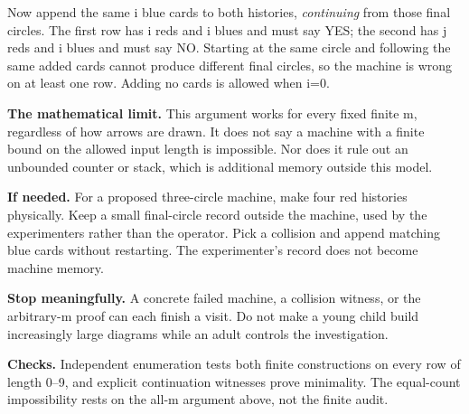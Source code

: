 \documentclass[11pt]{article}
\begin{document}
Now append the same i blue cards to both histories, \emph{continuing} from those final circles. The first row has i reds and i blues and must say YES; the second has j reds and i blues and must say NO. Starting at the same circle and following the same added cards cannot produce different final circles, so the machine is wrong on at least one row. Adding no cards is allowed when i=0.

\textbf{The mathematical limit.} This argument works for every fixed finite m, regardless of how arrows are drawn. It does not say a machine with a finite bound on the allowed input length is impossible. Nor does it rule out an unbounded counter or stack, which is additional memory outside this model.

\textbf{If needed.} For a proposed three-circle machine, make four red histories physically. Keep a small final-circle record outside the machine, used by the experimenters rather than the operator. Pick a collision and append matching blue cards without restarting. The experimenter's record does not become machine memory.

\textbf{Stop meaningfully.} A concrete failed machine, a collision witness, or the arbitrary-m proof can each finish a visit. Do not make a young child build increasingly large diagrams while an adult controls the investigation.

\textbf{Checks.} Independent enumeration tests both finite constructions on every row of length 0–9, and explicit continuation witnesses prove minimality. The equal-count impossibility rests on the all-m argument above, not the finite audit.
\end{document}
